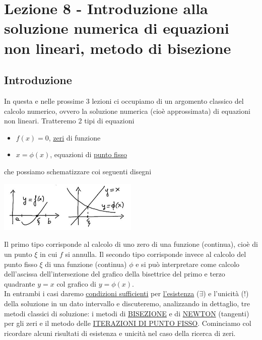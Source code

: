 \section[Lezione 8 - Metodo di bisezione]{Lezione 8 - Introduzione alla soluzione numerica di equazioni non lineari, metodo di bisezione}
\subsection{Introduzione}
In questa e nelle prossime 3 lezioni ci occupiamo di un argomento classico del calcolo numerico, ovvero la soluzione numerica (cioè approssimata) di equazioni non lineari. Tratteremo 2 tipi di equazioni
\begin{itemize}
    \item $f(x)=0$, \uline{zeri} di funzione
    \item $x=\phi(x)$, equazioni di \uline{punto fisso}
\end{itemize}
che possiamo schematizzare coi seguenti disegni
\begin{center}
        \includegraphics[width=0.5\textwidth]{foto/1}\par
\end{center}
Il primo tipo corrisponde al calcolo di uno zero di una funzione (continua), cioè di un punto $\xi$ in cui $f$ si annulla. Il secondo tipo corrisponde invece al calcolo del punto fisso $\xi$ di una funzione (continua) $\phi$ e si può interpretare come calcolo dell'ascissa dell'intersezione del grafico della bisettrice del primo e terzo quadrante $y=x$ col grafico di $y=\phi(x)$.\\ In entrambi i casi daremo \uline{condizioni sufficienti} per \uline{l'esistenza} ($\exists$) e l'unicità (!) della soluzione in un dato intervallo e discuteremo, analizzando in dettaglio, tre metodi classici di soluzione: i metodi di \uline{BISEZIONE} e di \uline{NEWTON} (tangenti) per gli zeri e il metodo delle \uline{ITERAZIONI DI PUNTO FISSO}.
\newline
Cominciamo col ricordare alcuni risultati di esistenza e unicità nel caso della ricerca di zeri.

